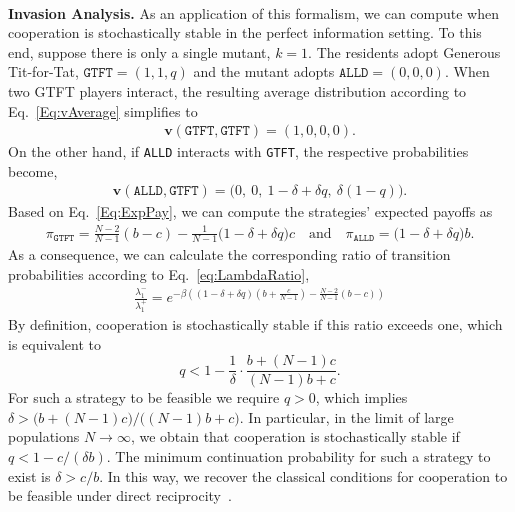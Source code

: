 \documentclass[11pt]{article}
\def\alld{\texttt{ALLD}}
\def\gtft{\texttt{GTFT}}
\theoremstyle{plainCl1}
\theoremstyle{plainCl2}
\begin{document}
~\\
{\bf Invasion Analysis.}
As an application of this formalism, we can compute when cooperation is stochastically stable in the perfect information setting. 
To this end, suppose there is only a single mutant, $k\!=\!1$. The residents adopt Generous Tit-for-Tat, $\gtft = (1, 1, q)$ and the mutant adopts $\alld\! = \! (0,0,0)$. When two GTFT players interact, the resulting average distribution according to Eq.~\eqref{Eq:vAverage} simplifies to
\begin{align*}
\mathbf{v}(\gtft,\gtft) = (1, 0, 0, 0).
\end{align*}
On the other hand, if \alld{} interacts with \gtft, the respective probabilities become,
\begin{align*}
  \mathbf{v}(\alld,\gtft) = \big(0,~0,~1\!-\!\delta\!+\!\delta q,~\delta(1\! -\! q)\big).
\end{align*}
Based on Eq.~\eqref{Eq:ExpPay}, we can compute the strategies' expected payoffs as
\begin{align*}
\pi_\gtft =  \frac{N\!-\!2}{N-1} (b - c)  \!-\! \frac{1}{N-1}\big(1\!-\!\delta\!+\!\delta q\big)c
\quad \text{and} \quad
\pi_\alld  = \big(1\!-\!\delta\!+\!\delta q\big)b.
\end{align*}
As a consequence, we can calculate the corresponding ratio of transition probabilities according to Eq.~\eqref{eq:LambdaRatio},
\begin{align*}
\frac{\lambda_1^{-}}{\lambda_1^{+}} = e^{-\beta \left( (1-\delta+\delta q)(b+\frac{c}{N-1})- \frac{N-2}{N-1}(b-c) \right)}
\end{align*}
By definition, cooperation is stochastically stable if this ratio exceeds one, which is equivalent to
\begin{equation*}
q<1-\frac{1}{\delta}\cdot \frac{b+(N\!-\!1)c}{(N\!-\!1)b+c}.
\end{equation*}
For such a strategy to be feasible we require $q\!>\!0$, which implies $\delta \!>\! \big(b+(N\!-\!1)c\big)/\big((N\!-\!1)b\!+\!c\big)$.
In particular, in the limit of large populations \(N \!\rightarrow\! \infty\), we obtain that cooperation is stochastically stable if  \(q \!<\! 1\! -\! c/(\delta b)\). 
The minimum continuation probability for such a strategy to exist is $\delta \!>\! c/b$. 
In this way, we recover the classical conditions for cooperation to be feasible under direct reciprocity~\citep{molander:jcr:1985,Nowak1992tit,Schmid:NHB:2021}.



\end{document}
